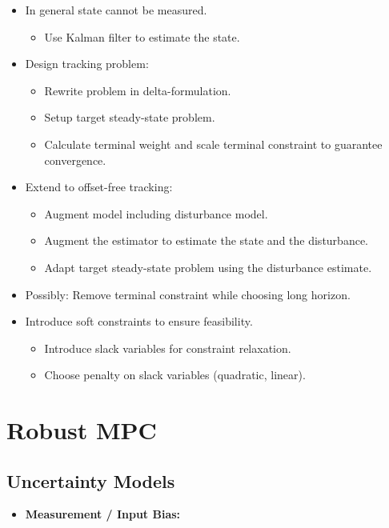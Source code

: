 \documentclass[8pt,a4paper]{scrartcl}
\begin{document}
\begin{multicols*}{3}
\begin{itemize}
\ncompaq
\item In general state cannot be measured.
\begin{itemize}
\ncompaq
\item Use Kalman filter to estimate the state.
\end{itemize}
\item Design tracking problem:
\begin{itemize}
\ncompaq
\item Rewrite problem in delta-formulation.
\item Setup target steady-state problem.
\item Calculate terminal weight and scale terminal constraint to guarantee convergence.
\end{itemize}
\item Extend to offset-free tracking:
\begin{itemize}
\ncompaq
\item Augment model including disturbance model.
\item Augment the estimator to estimate the state and the disturbance.
\item Adapt target steady-state problem using the disturbance estimate.
\end{itemize}
\item Possibly: Remove terminal constraint while choosing long horizon.
\item Introduce soft constraints to ensure feasibility.
\begin{itemize}
\ncompaq
\item Introduce slack variables for constraint relaxation.
\item Choose penalty on slack variables (quadratic, linear).
\end{itemize}
\end{itemize}

\section{Robust MPC}

\subsection{Uncertainty Models}

\begin{itemize}
\ncompaq
\item \textbf{Measurement / Input Bias:}


\end{itemize}
\end{multicols*}
\end{document}
